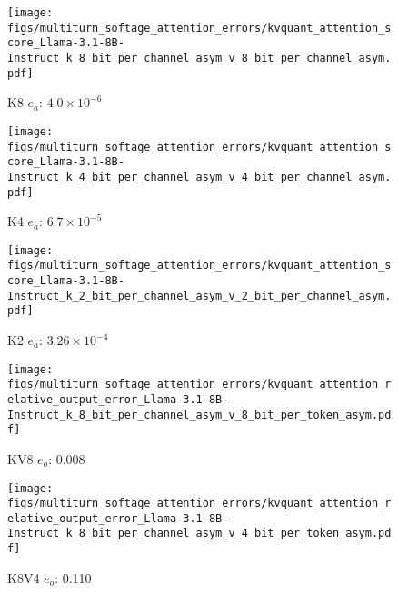 %
%
\begin{figure*}
    \centering
    \begin{subfigure}{0.25\columnwidth}
    \texttt{[image: figs/multiturn\_softage\_attention\_errors/kvquant\_attention\_score\_Llama-3.1-8B-Instruct\_k\_8\_bit\_per\_channel\_asym\_v\_8\_bit\_per\_channel\_asym.pdf]}
    \caption{K8 $e_a$: $4.0\times 10^{-6}$}
    \label{fig:kvcache_simulated_quant_attention_score_error_layer_wise_k8_per_channel_asym_Llama3.1-8B-Instruct_multirurn_softage}
    \end{subfigure}
    \begin{subfigure}{0.25\columnwidth}
    \texttt{[image: figs/multiturn\_softage\_attention\_errors/kvquant\_attention\_score\_Llama-3.1-8B-Instruct\_k\_4\_bit\_per\_channel\_asym\_v\_4\_bit\_per\_channel\_asym.pdf]}
    \caption{K4 $e_a$: $6.7\times 10^{-5}$}
    \label{fig:kvcache_simulated_quant_attention_score_error_layer_wise_k4_per_channel_asym_Llama3.1-8B-Instruct_multirurn_softage}
    \end{subfigure}
    \begin{subfigure}{0.25\columnwidth}
    \texttt{[image: figs/multiturn\_softage\_attention\_errors/kvquant\_attention\_score\_Llama-3.1-8B-Instruct\_k\_2\_bit\_per\_channel\_asym\_v\_2\_bit\_per\_channel\_asym.pdf]}
    \caption{K2 $e_a$: $3.26\times 10^{-4}$}
    \label{fig:kvcache_simulated_quant_attention_score_error_layer_wise_k2_per_channel_asym_Llama3.1-8B-Instruct_multirurn_softage}
    \end{subfigure}
    \begin{subfigure}{0.25\columnwidth}
    \texttt{[image: figs/multiturn\_softage\_attention\_errors/kvquant\_attention\_relative\_output\_error\_Llama-3.1-8B-Instruct\_k\_8\_bit\_per\_channel\_asym\_v\_8\_bit\_per\_token\_asym.pdf]}
    \caption{KV8 $e_o$: 0.008}
    \label{fig:kvcache_simulated_quant_error_layer_wise_k8_per_channe_asym_v8_per_token_asym_Llama3.1-8B-Instruct_multirurn_softage}
    \end{subfigure}
    \begin{subfigure}{0.25\columnwidth}
    \texttt{[image: figs/multiturn\_softage\_attention\_errors/kvquant\_attention\_relative\_output\_error\_Llama-3.1-8B-Instruct\_k\_8\_bit\_per\_channel\_asym\_v\_4\_bit\_per\_token\_asym.pdf]}
    \caption{K8V4 $e_o$: 0.110}
    \label{fig:kvcache_simulated_quant_error_layer_wise_k8_bit_per_channel_asym_v4_per_token_asym_Llama3.1-8B-Instruct_multirurn_softage}

\end{subfigure}
\end{figure*}
